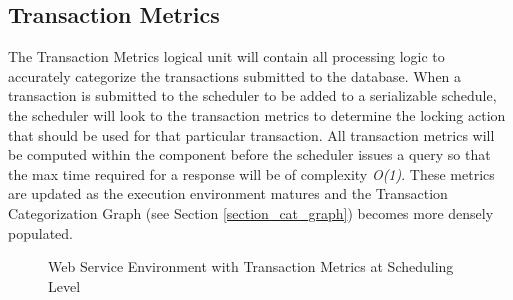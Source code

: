 \documentclass[conference]{IEEEtran}
\begin{document}
\subsection{Transaction Metrics}
The Transaction Metrics logical unit will contain all processing logic to accurately categorize the transactions submitted to the database. When a transaction is submitted to the scheduler to be added to a serializable schedule, the scheduler will look to the transaction metrics to determine the locking action that should be used for that particular transaction. All transaction metrics will be computed within the component before the scheduler issues a query so that the max time required for a response will be of complexity \textit{O(1)}. These metrics are updated as the execution environment matures and the Transaction Categorization Graph (see Section \ref{section_cat_graph}) becomes more densely populated. 

\begin{figure}[ht]  
\captionsetup{justification=centering}
\centering %


\caption{Web Service Environment with Transaction Metrics at Scheduling Level} %
\label{fig:ws_env_with_metrics} %

\end{figure}

\end{document}
